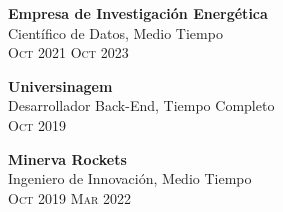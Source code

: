\documentclass[oneside]{article}
\begin{document}
{\begin{minipage}[t][\dimexpr\textheight-2\fboxrule-2\fboxsep\relax][t]{\dimexpr0.6\textwidth-2\fboxrule-2\fboxsep\relax}
        {\large \textbf{Empresa de Investigación Energética}} \\ 
        {{\selectfont Científico de Datos, Medio Tiempo}} \\ 
        {\scshape{}\selectfont\footnotesize Oct 2021 \textendash{} Oct 2023} 
        \vspace{.3cm}

        {\large \textbf{Universinagem}}\\
        {{\selectfont Desarrollador Back-End, Tiempo Completo}}\\
        {\scshape{}\selectfont\footnotesize Oct 2019 \textendash{} } 
        \vspace{.3cm}

        {\large \textbf{Minerva Rockets}}\\
        {{\selectfont Ingeniero de Innovación, Medio Tiempo}}\\
        {\scshape{}\selectfont\footnotesize Oct 2019 \textendash{} Mar 2022} 
        \vspace{.3cm}

\end{minipage}}
\end{document}
